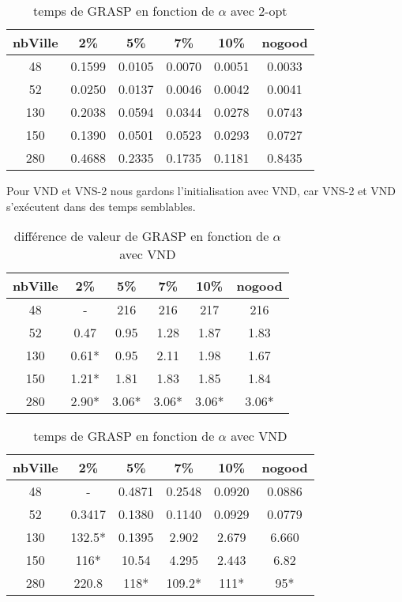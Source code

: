 \documentclass[12pt,a4paper]{article}
\begin{document}
\begin{table}[!h]
\centering
\begin{tabular}{|*{6}{c|}}
  \hline
  nbVille & 2\% & 5\% & 7\% & 10\% & nogood \\
  \hline
  48 & 0.1599 & 0.0105 & 0.0070 & 0.0051 & 0.0033 \\ 
  52 & 0.0250 & 0.0137 & 0.0046 & 0.0042 & 0.0041 \\
  130 & 0.2038 & 0.0594 & 0.0344 & 0.0278 & 0.0743 \\
  150 & 0.1390 & 0.0501 & 0.0523 & 0.0293 & 0.0727 \\  
  280 & 0.4688 & 0.2335 & 0.1735 & 0.1181 & 0.8435 \\
  \hline
\end{tabular}
\caption{temps de GRASP en fonction de $\alpha$ avec 2-opt}
\label{recherchelocaleGRASPtemps2optproba}
\end{table}

Pour VND et VNS-2 nous gardons l'initialisation avec VND, car VNS-2 et VND s’exécutent dans des temps semblables.

\begin{table}[!h]
\centering
\begin{tabular}{|*{6}{c|}}
  \hline
  nbVille & 2\% & 5\% & 7\% & 10\% & nogood \\
  \hline
  48 & - & 216 & 216 & 217 & 216 \\
  52 & 0.47 & 0.95 & 1.28 & 1.87 & 1.83 \\
  130 & 0.61* & 0.95 & 2.11 & 1.98 & 1.67 \\
  150 & 1.21* & 1.81 & 1.83 & 1.85 & 1.84 \\
  280 & 2.90* & 3.06* & 3.06* & 3.06* & 3.06* \\
  \hline
\end{tabular}
\caption{différence de valeur de GRASP en fonction de $\alpha$ avec VND}
\label{recherchelocaleGRASPtempsVNDproba}
\end{table}

\begin{table}[!h]
\centering
\begin{tabular}{|*{6}{c|}}
  \hline
  nbVille & 2\% & 5\% & 7\% & 10\% & nogood \\
  \hline
  48 & - & 0.4871 & 0.2548 & 0.0920 & 0.0886 \\
  52 & 0.3417 & 0.1380 & 0.1140 & 0.0929 & 0.0779 \\
  130 & 132.5* & 0.1395 & 2.902 & 2.679 & 6.660 \\
  150 & 116* & 10.54 & 4.295 & 2.443 & 6.82 \\
  280 & 220.8 & 118* & 109.2* & 111* & 95* \\
  \hline
\end{tabular}
\caption{temps de GRASP en fonction de $\alpha$ avec VND}
\label{recherchelocaleGRASPvalVNSproba}
\end{table}
\end{document}
